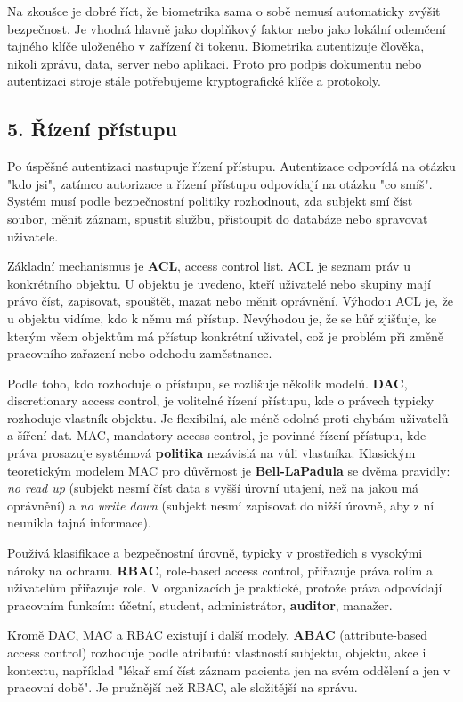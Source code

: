 Na zkoušce je dobré říct, že biometrika sama o sobě nemusí automaticky zvýšit bezpečnost. Je vhodná hlavně jako doplňkový faktor nebo jako lokální odemčení tajného klíče uloženého v zařízení či tokenu. Biometrika autentizuje člověka, nikoli zprávu, data, server nebo aplikaci. Proto pro podpis dokumentu nebo autentizaci stroje stále potřebujeme kryptografické klíče a protokoly.

\subsection*{5. Řízení přístupu}

Po úspěšné autentizaci nastupuje řízení přístupu. Autentizace odpovídá na otázku "kdo jsi", zatímco autorizace a řízení přístupu odpovídají na otázku "co smíš". Systém musí podle bezpečnostní politiky rozhodnout, zda subjekt smí číst soubor, měnit záznam, spustit službu, přistoupit do databáze nebo spravovat uživatele.

Základní mechanismus je \textbf{ACL}, access control list. ACL je seznam práv u konkrétního objektu. U objektu je uvedeno, kteří uživatelé nebo skupiny mají právo číst, zapisovat, spouštět, mazat nebo měnit oprávnění. Výhodou ACL je, že u objektu vidíme, kdo k němu má přístup. Nevýhodou je, že se hůř zjišťuje, ke kterým všem objektům má přístup konkrétní uživatel, což je problém při změně pracovního zařazení nebo odchodu zaměstnance.

Podle toho, kdo rozhoduje o přístupu, se rozlišuje několik modelů. \textbf{DAC}, discretionary access control, je volitelné řízení přístupu, kde o právech typicky rozhoduje vlastník objektu. Je flexibilní, ale méně odolné proti chybám uživatelů a šíření dat. MAC, mandatory access control, je povinné řízení přístupu, kde práva prosazuje systémová \textbf{politika} nezávislá na vůli vlastníka. Klasickým teoretickým modelem MAC pro důvěrnost je \textbf{Bell-LaPadula} se dvěma pravidly: \emph{no read up} (subjekt nesmí číst data s vyšší úrovní utajení, než na jakou má oprávnění) a \emph{no write down} (subjekt nesmí zapisovat do nižší úrovně, aby z ní neunikla tajná informace).

Používá klasifikace a bezpečnostní úrovně, typicky v prostředích s vysokými nároky na ochranu. \textbf{RBAC}, role-based access control, přiřazuje práva rolím a uživatelům přiřazuje role. V organizacích je praktické, protože práva odpovídají pracovním funkcím: účetní, student, administrátor, \textbf{auditor}, manažer.

Kromě DAC, MAC a RBAC existují i další modely. \textbf{ABAC} (attribute-based access control) rozhoduje podle atributů: vlastností subjektu, objektu, akce i kontextu, například "lékař smí číst záznam pacienta jen na svém oddělení a jen v pracovní době". Je pružnější než RBAC, ale složitější na správu.

